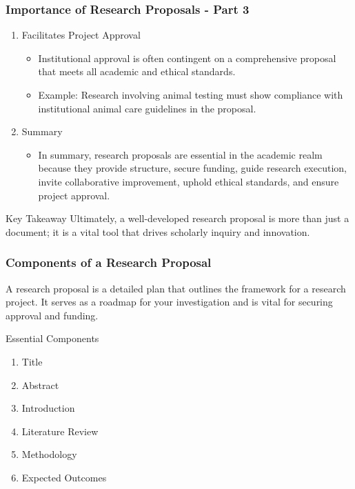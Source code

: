 \documentclass[aspectratio=169]{beamer}
\begin{document}
\begin{frame}[fragile]
    \frametitle{Importance of Research Proposals - Part 3}
    \begin{enumerate}[resume]
        \item Facilitates Project Approval
            \begin{itemize}
                \item Institutional approval is often contingent on a comprehensive proposal that meets all academic and ethical standards.
                \item Example: Research involving animal testing must show compliance with institutional animal care guidelines in the proposal.
            \end{itemize}
        \item Summary
            \begin{itemize}
                \item In summary, research proposals are essential in the academic realm because they provide structure, secure funding, guide research execution, invite collaborative improvement, uphold ethical standards, and ensure project approval.
            \end{itemize}
    \end{enumerate}
    
    \begin{block}{Key Takeaway}
        Ultimately, a well-developed research proposal is more than just a document; it is a vital tool that drives scholarly inquiry and innovation.
    \end{block}
\end{frame}

\begin{frame}[fragile]
  \frametitle{Components of a Research Proposal}
  A research proposal is a detailed plan that outlines the framework for a research project. It serves as a roadmap for your investigation and is vital for securing approval and funding.
  \begin{block}{Essential Components}
    \begin{enumerate}
      \item Title
      \item Abstract
      \item Introduction
      \item Literature Review
      \item Methodology
      \item Expected Outcomes
    \end{enumerate}
  \end{block}
\end{frame}
\end{document}

